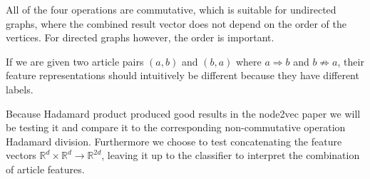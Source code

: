 
All of the four operations are commutative, which is suitable for undirected graphs, where the combined result vector does not depend on the order of the vertices. For directed graphs however, the order is important.


If we are given two article pairs $(a,b)$ and $(b,a)$ where $a \Rightarrow b$ and $b \not \Rightarrow a$, their feature representations should intuitively be different because they have different labels.


Because Hadamard product produced good results in the node2vec paper we will be testing it and compare it to the corresponding non-commutative operation Hadamard division. Furthermore we choose to test concatenating the feature vectors $\mathbb{R}^d \times \mathbb{R}^d \to \mathbb{R}^{2d}$, leaving it up to the classifier to interpret the combination of article features.




